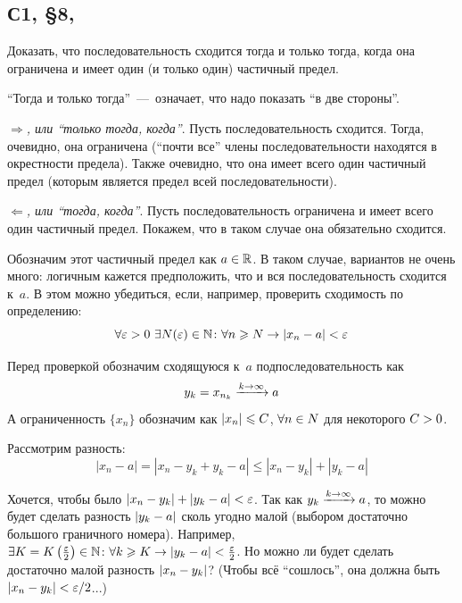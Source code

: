 \documentclass[a4paper,12pt]{article}
\begin{document}
  
  \subsection{С1, \S 8, }
  
  Доказать, что последовательность сходится тогда и только тогда, когда она ограничена и имеет один (и только один) частичный предел.  %
  
  \begin{solution}
    ``Тогда и только тогда''~---~означает, что надо показать ``в две стороны''.
    
    \emph{$\Rightarrow$, или ``только тогда, когда''}.
    Пусть последовательность сходится.
    Тогда, очевидно, она ограничена (``почти все'' члены последовательности находятся в окрестности предела).
    Также очевидно, что она имеет всего один частичный предел (которым является предел всей последовательности).
    
    \medskip
    
    \emph{$\Leftarrow$, или ``тогда, когда''}.
    Пусть последовательность ограничена и имеет всего один частичный предел.
    Покажем, что в таком случае она обязательно сходится.
    
    Обозначим этот частичный предел как $a \hm\in \RR$.
    В таком случае, вариантов не очень много: логичным кажется предположить, что и вся последовательность сходится к~$a$.
    В этом можно убедиться, если, например, проверить сходимость по определению:
    \begin{equation}\label{eq:119-leftarrow}
      \forall \varepsilon > 0\ \exists N(\varepsilon) \in \mathbb N\colon \forall n \geqslant N \to |x_n - a| < \varepsilon
    \end{equation}
    
    Перед проверкой обозначим сходящуюся к~$a$ подпоследовательность как
    \[
      y_k \hm= x_{n_k} \hm{\xrightarrow{k \to \infty}} a
    \]
    А ограниченность $\{x_n\}$ обозначим как $|x_n| \hm\leq C$, $\forall n \hm\in N$ для некоторого $C \hm> 0$.
    
    Рассмотрим разность:
    \[
      |x_n - a|
      = |x_n - y_k + y_k - a|
      \leq |x_n - y_k| + |y_k - a|
    \]
    
    Хочется, чтобы было $|x_n \hm- y_k| \hm+ |y_k \hm- a| \hm< \eps$.
    Так как $y_k \hm{\xrightarrow{k \to \infty}} a$, то можно будет сделать разность $|y_k \hm- a|$ сколь угодно малой (выбором достаточно большого граничного номера).
    Например, $\exists K \hm= K\left(\frac{\eps}{2}\right) \hm\in \NN\colon \forall k \hm\geq K \hm\to |y_k \hm- a| \hm< \frac{\eps}{2}$.
    Но можно ли будет сделать достаточно малой разность $|x_n \hm- y_k|$?
    (Чтобы всё ``сошлось'', она должна быть $|x_n \hm- y_k| \hm< \eps \hm/ 2$...)
    

\end{solution}
\end{document}
